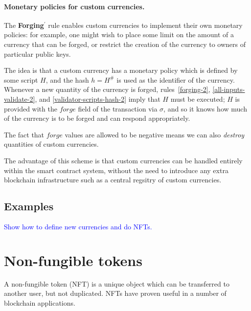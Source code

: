 \documentclass[a4paper]{article}
\newcommand{\blue}[1]{\textcolor{blue}{#1}}
\theoremstyle{definition}  %
\newcommand{\mi}[1]{\ensuremath{\mathit{#1}}}
\newcommand{\forge}{\mi{forge}}
\begin{document}
\paragraph{Monetary policies for custom currencies.}
The \textbf{Forging$^{\prime}$}
rule enables custom currencies to implement their own monetary
policies: for example, one might wish to place some limit on the
amount of a currency that can be forged, or restrict the creation of
the currency to owners of particular public keys.

The idea is that a custom currency has a monetary policy which is
defined by some script $H$, and the hash $h = H^{\#}$ is used as the
identifier of the currency.  Whenever a new quantity of the currency
is forged, rules~\ref{forging-2}, \ref{all-inputs-validate-2}, and
\ref{validator-scripts-hash-2} imply that $H$ must be executed; $H$ is
provided with the \forge{} field of the transaction via $\sigma$, and
so it knows how much of the currency is to be forged and can respond
appropriately.

The fact that \forge{} values are allowed to be negative means we can
also \textit{destroy} quantities of custom currencies.

The advantage of this scheme is that custom currencies can be handled
entirely within the smart contract system, without the need to
introduce any extra blockchain infrastructure such as a central
regsitry of custom currencies.


\subsection{Examples}
\blue{Show how to define new currencies and do NFTs.}

\section{Non-fungible tokens}
A non-fungible token (NFT) is a unique object which can be transferred
to another user, but not duplicated.  NFTs have proven useful in a number
of blockchain applications.
\end{document}
